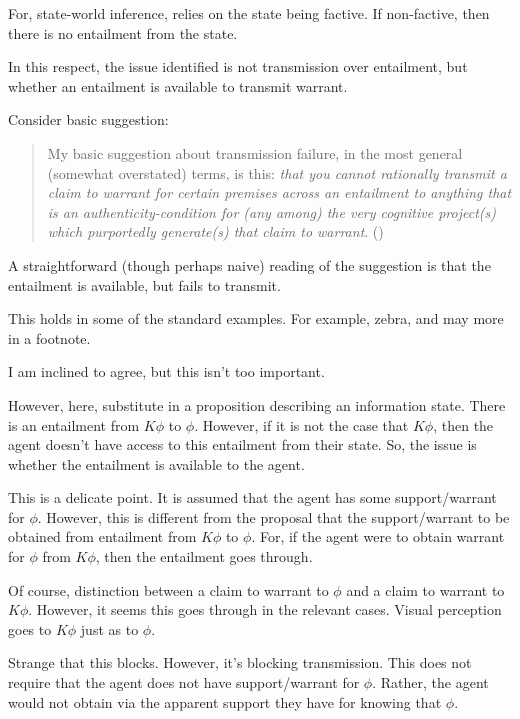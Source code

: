 \documentclass[10pt]{article}
\begin{document}
\newpage






\begin{note}
  For, state-world inference, relies on the state being factive.
  If non-factive, then there is no entailment from the state.

  In this respect, the issue identified is not transmission over entailment, but whether an entailment is available to transmit warrant.

  Consider \citeauthor{Wright:2012uy} basic suggestion:
  \begin{quote}
    My basic suggestion about transmission failure, in the most general (somewhat overstated) terms, is this: \emph{that you cannot rationally transmit a claim to warrant for certain premises across an entailment to anything that is an authenticity-condition for (any among) the very cognitive project(s) which purportedly generate(s) that claim to warrant}.\nolinebreak
    \mbox{}\hfill\mbox{(\citeyear[467--468]{Wright:2012uy})}
  \end{quote}
  A straightforward (though perhaps naive) reading of the suggestion is that the entailment is available, but fails to transmit.

  This holds in some of the standard examples.
  For example, zebra, and may more in a footnote.

  I am inclined to agree, but this isn't too important.

  However, here, substitute in a proposition describing an information state.
  There is an entailment from \(K\phi\) to \(\phi\).
  However, if it is not the case that \(K\phi\), then the agent doesn't have access to this entailment from their state.
  So, the issue is whether the entailment is available to the agent.

  This is a delicate point.
  It is assumed that the agent has some support/warrant for \(\phi\).
  However, this is different from the proposal that the support/warrant to be obtained from entailment from \(K\phi\) to \(\phi\).
  For, if the agent were to obtain warrant for \(\phi\) from \(K\phi\), then the entailment goes through.

  Of course, distinction between a claim to warrant to \(\phi\) and a claim to warrant to \(K\phi\).
  However, it seems this goes through in the relevant cases.
  Visual perception goes to \(K\phi\) just as to \(\phi\).

  Strange that this blocks.
  However, it's blocking transmission.
  This does not require that the agent does not have support/warrant for \(\phi\).
  Rather, the agent would not obtain via the apparent support they have for knowing that \(\phi\).


\end{note}
\end{document}
